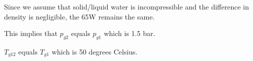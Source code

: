 Since we assume that solid/liquid water is incompressible and the difference in density is negligible, the 65W remains the same.

This implies that \( p_{g2} \) equals \( p_{g1} \) which is 1.5 bar.

\( T_{g12} \) equals \( T_{g1} \) which is 50 degrees Celsius.